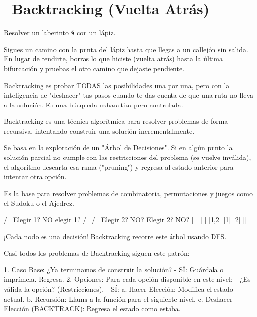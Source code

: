 ﻿\chapter[\emj{↩️}~Backtracking (Vuelta Atrás)]{~Backtracking (Vuelta Atrás)}

\begin{dsaquees}
Resolver un laberinto 🌀 con un lápiz. 

Sigues un camino con la punta del lápiz hasta que llegas a un 
callejón sin salida. En lugar de rendirte, borras lo que hiciste 
(vuelta atrás) hasta la última bifurcación y pruebas el otro camino 
que dejaste pendiente.

Backtracking es probar TODAS las posibilidades una por una, pero 
con la inteligencia de "deshacer" tus pasos cuando te das cuenta 
de que una ruta no lleva a la solución. Es una búsqueda exhaustiva 
pero controlada.
\end{dsaquees}
\begin{dsaotraforma}
Backtracking es una técnica algorítmica para resolver problemas de 
forma recursiva, intentando construir una solución incrementalmente. 

Se basa en la exploración de un "Árbol de Decisiones". Si en algún 
punto la solución parcial no cumple con las restricciones del problema 
(se vuelve inválida), el algoritmo descarta esa rama ("pruning") y 
regresa al estado anterior para intentar otra opción.

Es la base para resolver problemas de combinatoria, permutaciones y 
juegos como el Sudoku o el Ajedrez.
\end{dsaotraforma}
\begin{dsadiagrama}
[root]
              /      \
        Elegir 1?   NO elegir 1?
         /    \        /      \
     Elegir 2? NO?   Elegir 2? NO?
       |        |       |        |
     [1,2]     [1]     [2]      []

¡Cada nodo es una decisión! Backtracking recorre este árbol usando DFS.
\end{dsadiagrama}
\begin{dsacomofunciona}
Casi todos los problemas de Backtracking siguen este patrón:

1. Caso Base: ¿Ya terminamos de construir la solución?
   - SÍ: Guárdala o imprímela. Regresa.
2. Opciones: Para cada opción disponible en este nivel:
   - ¿Es válida la opción? (Restricciones).
   - SÍ: 
     a. Hacer Elección: Modifica el estado actual.
     b. Recursión: Llama a la función para el siguiente nivel.
     c. Deshacer Elección (BACKTRACK): Regresa el estado como estaba.
\end{dsacomofunciona}
